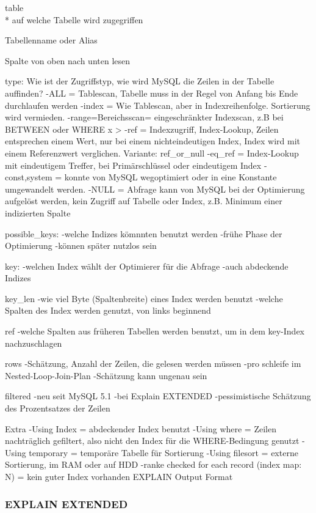table\\*
auf welche Tabelle wird zugegriffen
\begin{description}
	\item Tabellenname oder Alias
	\item Spalte von oben nach unten lesen
\end{description}

type:
Wie ist der Zugriffstyp, wie wird MySQL die Zeilen in der Tabelle auffinden?
-ALL = Tablescan, Tabelle muss in der Regel von Anfang bis Ende durchlaufen werden
-index = Wie Tablescan, aber in Indexreihenfolge. Sortierung wird vermieden.
-range=Bereichsscan= eingeschränkter Indexscan, z.B bei BETWEEN oder WHERE x >
-ref = Indexzugriff, Index-Lookup, Zeilen entsprechen einem Wert, nur bei einem nichteindeutigen Index, Index wird mit einem Referenzwert verglichen. Variante: ref\_or\_null
-eq\_ref = Index-Lookup mit eindeutigem Treffer, bei Primärschlüssel oder eindeutigem Index
-const,system = konnte von MySQL wegoptimiert oder in eine Konstante umgewandelt werden.
-NULL = Abfrage kann von MySQL bei der Optimierung aufgelöst werden, kein Zugriff auf Tabelle oder Index, z.B. Minimum einer indizierten Spalte

possible\_keys:
-welche Indizes kömnnten benutzt werden
-frühe Phase der Optimierung
-können später nutzlos sein

key:
-welchen Index wählt der Optimierer für die Abfrage
-auch abdeckende Indizes

key\_len
-wie viel Byte (Spaltenbreite) eines Index werden benutzt
-welche Spalten des Index werden genutzt, von links beginnend

ref
-welche Spalten aus früheren Tabellen werden benutzt, um in dem key-Index nachzuschlagen

rows
-Schätzung, Anzahl der Zeilen, die gelesen werden müssen
-pro schleife im Nested-Loop-Join-Plan
-Schätzung kann ungenau sein

filtered
-neu seit MySQL 5.1
-bei Explain EXTENDED
-pessimistische Schätzung des Prozentsatzes der Zeilen

Extra
-Using Index = abdeckender Index benutzt
-Using where = Zeilen nachträglich gefiltert, also nicht den Index für die WHERE-Bedingung genutzt
-Using temporary = temporäre Tabelle für Sortierung
-Using filesort = externe Sortierung, im RAM oder auf HDD
-ranke checked for each record (index map: N) = kein guter Index vorhanden
EXPLAIN Output Format \cite{refman2}

\subsubsection{EXPLAIN EXTENDED}
